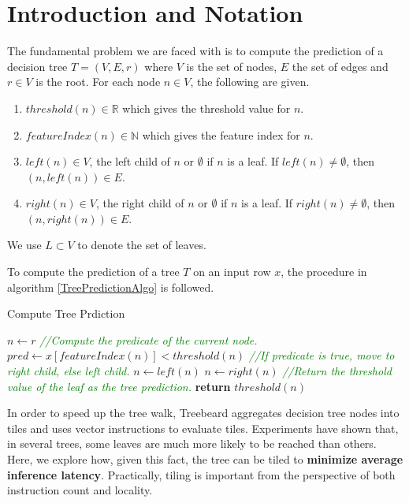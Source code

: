 \section{Introduction and Notation}

The fundamental problem we are faced with is to compute the prediction of a decision tree $T = (V, E, r)$ where $V$ is the set of nodes, $E$ the set of edges and
$r \in V$ is the root. For each node $n \in V$, the following are given.
\begin{enumerate}
    \item $threshold(n) \in \mathbb{R}$ which gives the threshold value for $n$.
    \item $featureIndex(n) \in \mathbb{N}$ which gives the feature index for $n$.
    \item $left(n) \in V$, the left child of $n$ or $\emptyset$ if $n$ is a leaf. If $left(n) \neq \emptyset$, then $(n, left(n)) \in E$.
    \item $right(n) \in V$, the right child of $n$ or $\emptyset$ if $n$ is a leaf. If $right(n) \neq \emptyset$, then $(n, right(n)) \in E$.
\end{enumerate}
We use $L \subset V$ to denote the set of leaves. 

To compute the prediction of a tree $T$ on an input row $x$, the procedure in algorithm \ref{TreePredictionAlgo} is followed.
\begin{algorithm}
    \caption{Compute Tree Prdiction}
    \label{TreePredictionAlgo}
    \begin{algorithmic}
            \State $n \leftarrow r$
                \State \textcolor{green}{\textit{//Compute the predicate of the current node.}}
                \State $pred \leftarrow x[featureIndex(n)] < threshold(n)$
                \State \textcolor{green}{\textit{//If predicate is true, move to right child, else left child.}}
                    \State $n \leftarrow left(n)$
                \Else
                    \State $n \leftarrow right(n)$
                \EndIf
            \EndWhile
            \State \textcolor{green}{\textit{//Return the threshold value of the leaf as the tree prediction.}}
            \State \textbf{return} $threshold(n)$
        \EndProcedure
    \end{algorithmic}
\end{algorithm}

In order to speed up the tree walk, Treebeard aggregates decision tree nodes into tiles and uses vector instructions to evaluate tiles.
Experiments have shown that, in several trees, some leaves are much more likely to be reached than others. Here, we explore how, 
given this fact, the tree can be tiled to \textbf{minimize average inference latency}. Practically, tiling is important from the perspective of both instruction count and locality.  

